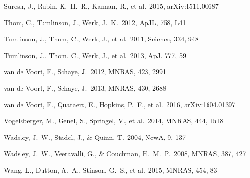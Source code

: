 \documentclass[useAMS,usenatbib]{mn2e}
\def \apj {ApJ}
\def \apjl {ApJL}
\def \mnras {MNRAS}
\def \na {NewA}
\begin{document}
\begin{thebibliography}{}
%
 Suresh, J., Rubin, K.~H.~R., Kannan, R., et al.\ 2015, arXiv:1511.00687


Thom, C., Tumlinson, J., Werk, J.~K.\ 2012, \apjl, 758, L41

 Tumlinson, J., Thom, C., Werk, J., et al.\ 2011, Science, 334, 948

 Tumlinson, J., Thom, C., Werk, J., et al.\ 2013, \apj, 777, 59


 van de Voort, F., Schaye, J.\ 2012, \mnras, 423, 2991

 van de Voort, F., Schaye, J.\ 2013, \mnras, 430, 2688

 van de Voort, F., Quataert, E., Hopkins, P.~F., et al.\ 2016, arXiv:1604.01397

 Vogelsberger, M., 
Genel, S., Springel, V., et al.\ 2014, \mnras, 444, 1518 



 Wadsley, J.~W., Stadel, 
J., \& Quinn, T.\ 2004, \na, 9, 137 

 Wadsley, J.~W., 
Veeravalli, G., \& Couchman, H.~M.~P.\ 2008, \mnras, 387, 427 

 Wang, L., Dutton, A.~A.,  Stinson, G.~S., et al.\ 2015, \mnras, 454, 83


\end{thebibliography}
\end{document}

